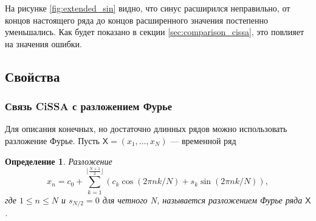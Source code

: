 \documentclass[a4paper, 11pt]{article}
\newcommand{\SSA}{\textbf{SSA}}
\newcommand{\CISSA}{\textbf{CiSSA}}
\newcommand{\TS}{\mathsf{X}}
\newtheorem{definition}{Определение} %
\newtheorem{theorem}{Теорема} %
\begin{document}
На рисунке \ref{fig:extended_sin} видно, что синус расширился неправильно, от концов настоящего ряда до концов расширенного значения постепенно уменьшались. Как будет показано в секции \ref{sec:comparison_cissa}, это повлияет на значения ошибки.




\subsection{Свойства}

%
%
%
%
%

\subsubsection{Связь CiSSA с разложением Фурье}
\label{subsec:cissa_fourier}
Для описания конечных, но достаточно длинных рядов можно использовать разложение Фурье. Пусть $\TS = (x_1, \dots, x_N)$ — временной ряд
\begin{definition}
	Разложение
	\begin{equation}
		\label{eq:fourier}
		x_n = c_0 + \sum\limits_{k = 1}^{\lfloor \frac{N+1}{2} \rfloor}\left(c_k \cos(2\pi n k / N) + s_k \sin(2\pi n k / N) \right),
	\end{equation}
	где $1 \leq n \leq N$ и $s_{N/2} = 0 $ для четного N, называется разложением Фурье ряда $\TS$.
\end{definition}
\end{document}
